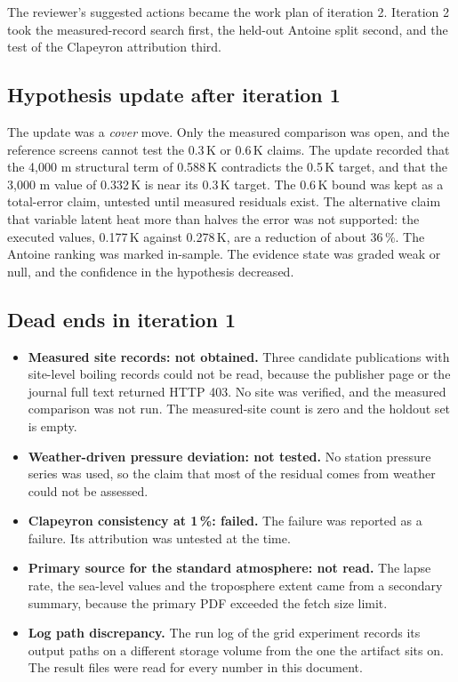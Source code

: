 \documentclass[11pt,letterpaper]{article}
\begin{document}
The reviewer's suggested actions became the work plan of iteration 2. Iteration 2 took the measured-record search first, the held-out Antoine split second, and the test of the Clapeyron attribution third.

\subsection{Hypothesis update after iteration 1}

The update was a \emph{cover} move. Only the measured comparison was open, and the reference screens cannot test the 0.3\,K or 0.6\,K claims. The update recorded that the 4,000 m structural term of 0.588\,K contradicts the 0.5\,K target, and that the 3,000 m value of 0.332\,K is near its 0.3\,K target. The 0.6\,K bound was kept as a total-error claim, untested until measured residuals exist. The alternative claim that variable latent heat more than halves the error was not supported: the executed values, 0.177\,K against 0.278\,K, are a reduction of about 36\,\%. The Antoine ranking was marked in-sample. The evidence state was graded weak or null, and the confidence in the hypothesis decreased.

\subsection{Dead ends in iteration 1}

\begin{itemize}
\item \textbf{Measured site records: not obtained.} Three candidate publications with site-level boiling records could not be read, because the publisher page or the journal full text returned HTTP 403. No site was verified, and the measured comparison was not run. The measured-site count is zero and the holdout set is empty.
\item \textbf{Weather-driven pressure deviation: not tested.} No station pressure series was used, so the claim that most of the residual comes from weather could not be assessed.
\item \textbf{Clapeyron consistency at 1\,\%: failed.} The failure was reported as a failure. Its attribution was untested at the time.
\item \textbf{Primary source for the standard atmosphere: not read.} The lapse rate, the sea-level values and the troposphere extent came from a secondary summary, because the primary PDF exceeded the fetch size limit.
\item \textbf{Log path discrepancy.} The run log of the grid experiment records its output paths on a different storage volume from the one the artifact sits on. The result files were read for every number in this document.
\end{itemize}
\end{document}
